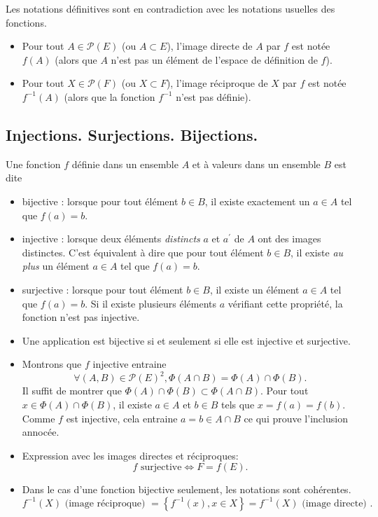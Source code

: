 Les notations définitives sont en contradiction avec les notations usuelles des fonctions.
\begin{itemize}
  \item Pour tout $A\in \mathcal{P}(E)$ (ou $A\subset E$), l'image directe de $A$ par $f$ est notée $f(A)$ (alors que $A$ n'est pas un élément de l'espace de définition de $f$).
  \item Pour tout $X\in \mathcal{P}(F)$ (ou $X\subset F$), l'image réciproque de $X$ par $f$ est notée $f^{-1}(A)$ (alors que la fonction $f^{-1}$ n'est pas définie).
\end{itemize}


\subsection{Injections. Surjections. Bijections.}
\begin{defi}
Une fonction $f$ définie dans un ensemble $A$ et à valeurs dans un ensemble $B$  est dite
\begin{itemize}
 \item bijective : lorsque pour tout élément $b\in B$, il existe exactement un $a\in A$ tel que $f(a)=b$.
\item injective : lorsque deux éléments \emph{distincts} $a$ et $a^\prime$ de $A$ ont des images distinctes. C'est équivalent à dire que pour tout élément $b\in B$, il existe \emph{au plus} un élément $a\in A$ tel que $f(a)=b$.
\item surjective : lorsque pour tout élément $b\in B$, il existe un élément $a\in A$ tel que $f(a)=b$. Si il existe plusieurs éléments $a$ vérifiant cette propriété, la fonction n'est pas injective.
\end{itemize}  
\end{defi}


\begin{rems}
\begin{itemize}
  \item Une application est bijective si et seulement si elle est injective et surjective.
  \item   Montrons que $f$ injective entraine
\[
  \forall (A,B)\in \mathcal{P}(E)^2, \Phi(A\cap B) = \Phi(A) \cap \Phi(B).
\]
Il suffit de montrer que $\Phi(A) \cap \Phi(B) \subset \Phi(A\cap B)$.\newline
Pour tout $x\in \Phi(A) \cap \Phi(B)$, il existe $a\in A$ et $b\in B$ tels que $x = f(a) = f(b)$. Comme $f$ est injective, cela entraine $a=b \in A \cap B$ ce qui prouve l'inclusion annocée.
  \item Expression avec les images directes et réciproques:
\[
  f \text{ surjective} \Leftrightarrow F = f(E).
\]
  \item Dans le cas d'une fonction bijective seulement, les notations sont cohérentes.
\[
  f^{-1}(X) \text{ (image réciproque) } = \left\lbrace f^{-1}(x), x\in X \right\rbrace
  = f^{-1}(X) \text{ (image directe) }.
\]

\end{itemize}
\end{rems}

